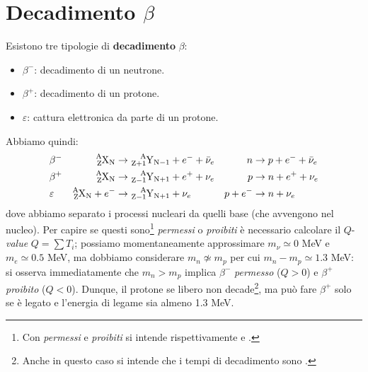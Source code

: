 \section{Decadimento $\beta$}
Esistono tre tipologie di \textbf{decadimento} $\beta$:
\begin{itemize}
    \item $\beta^-$: decadimento di un neutrone.
    \item $\beta^+$: decadimento di un protone.
    \item $\varepsilon$: cattura elettronica da parte di un protone.
\end{itemize}
\noindent Abbiamo quindi:
\begin{displaymath}
\begin{aligned}
&\beta^- & \ce{^A_ZX_N}&\to \ce{^A_{Z+1}Y_{N-1}} + e^- + \bar{\nu}_e & n&\to p + e^- + \bar{\nu}_e \\
&\beta^+ & \ce{^A_ZX_N}&\to \ce{^A_{Z-1}Y_{N+1}} + e^+ + \nu_e & p &\to n + e^+ + \nu_e \\
&\varepsilon & \ce{^A_ZX_N} + e^-&\to \ce{^A_{Z-1}Y_{N+1}}  + \nu_e & p+e^- &\to n + \nu_e
\end{aligned}
\end{displaymath}
dove abbiamo separato i processi nucleari da quelli base (che avvengono nel nucleo). Per capire se questi sono\footnote{Con \textit{permessi} e \textit{proibiti} si intende rispettivamente  e .} \textit{permessi} o \textit{proibiti} è necessario calcolare il $Q$-\textit{value} $Q=\sum T_i$; possiamo momentaneamente approssimare $m_{\nu}\simeq 0$ MeV e $m_e \simeq 0.5$ MeV, ma dobbiamo considerare $m_n \not \simeq m_p$ per cui $m_n - m_p \simeq 1.3$ MeV: si osserva immediatamente che $m_n>m_p$ implica $\beta^-$ \textit{permesso} ($Q>0$) e $\beta^+$ \textit{proibito} ($Q<0$). Dunque, il protone se libero non decade\footnote{Anche in questo caso si intende che i tempi di decadimento sono .}, ma può fare $\beta^+$ solo se è legato e l'energia di legame sia almeno 1.3 MeV.

